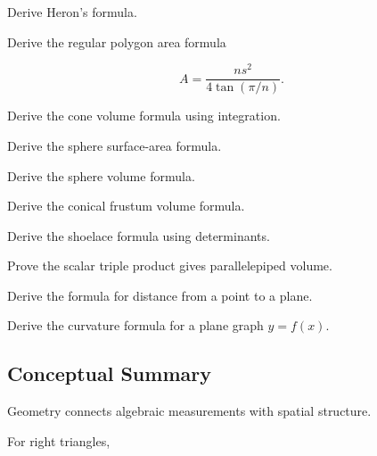 \begin{exercise}[4]
Derive Heron's formula.
\end{exercise}

\begin{exercise}[4]
Derive the regular polygon area formula

\[
A
=
\frac{ns^2}{4\tan(\pi/n)}.
\]
\end{exercise}

\begin{exercise}[4]
Derive the cone volume formula using integration.
\end{exercise}

\begin{exercise}[4]
Derive the sphere surface-area formula.
\end{exercise}

\begin{exercise}[4]
Derive the sphere volume formula.
\end{exercise}

\begin{exercise}[4]
Derive the conical frustum volume formula.
\end{exercise}

\begin{exercise}[4]
Derive the shoelace formula using determinants.
\end{exercise}

\begin{exercise}[4]
Prove the scalar triple product gives parallelepiped volume.
\end{exercise}

\begin{exercise}[4]
Derive the formula for distance from a point to a plane.
\end{exercise}

\begin{exercise}[4]
Derive the curvature formula for a plane graph \(y=f(x)\).
\end{exercise}

\subsection{Conceptual Summary}
\label{subsec:geometric-formulas-summary}

Geometry connects algebraic measurements with spatial structure.

For right triangles,

